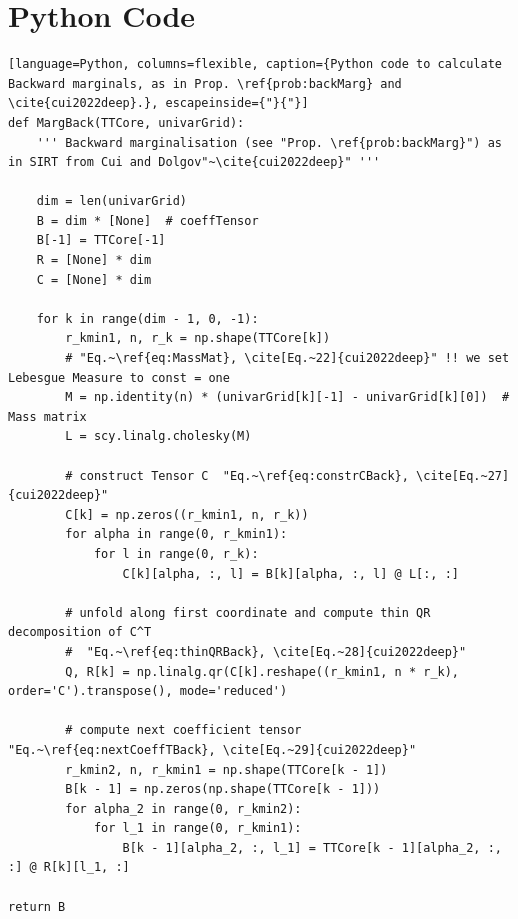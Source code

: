 \section{Python Code}

\begin{lstlisting}[language=Python, columns=flexible, caption={Python code to calculate Backward marginals, as in Prop. \ref{prob:backMarg} and \cite{cui2022deep}.}, escapeinside={"}{"}]
def MargBack(TTCore, univarGrid):
	''' Backward marginalisation (see "Prop. \ref{prob:backMarg}") as in SIRT from Cui and Dolgov"~\cite{cui2022deep}" '''
	
	dim = len(univarGrid)
	B = dim * [None]  # coeffTensor
	B[-1] = TTCore[-1]
	R = [None] * dim
	C = [None] * dim
	
	for k in range(dim - 1, 0, -1):
		r_kmin1, n, r_k = np.shape(TTCore[k])
		# "Eq.~\ref{eq:MassMat}, \cite[Eq.~22]{cui2022deep}" !! we set Lebesgue Measure to const = one
		M = np.identity(n) * (univarGrid[k][-1] - univarGrid[k][0])  # Mass matrix
		L = scy.linalg.cholesky(M)
		
		# construct Tensor C  "Eq.~\ref{eq:constrCBack}, \cite[Eq.~27]{cui2022deep}"
		C[k] = np.zeros((r_kmin1, n, r_k))
		for alpha in range(0, r_kmin1):
			for l in range(0, r_k):
				C[k][alpha, :, l] = B[k][alpha, :, l] @ L[:, :]
		
		# unfold along first coordinate and compute thin QR decomposition of C^T
		#  "Eq.~\ref{eq:thinQRBack}, \cite[Eq.~28]{cui2022deep}"
		Q, R[k] = np.linalg.qr(C[k].reshape((r_kmin1, n * r_k), order='C').transpose(), mode='reduced')
		
		# compute next coefficient tensor "Eq.~\ref{eq:nextCoeffTBack}, \cite[Eq.~29]{cui2022deep}"
		r_kmin2, n, r_kmin1 = np.shape(TTCore[k - 1])
		B[k - 1] = np.zeros(np.shape(TTCore[k - 1]))
		for alpha_2 in range(0, r_kmin2):
			for l_1 in range(0, r_kmin1):
				B[k - 1][alpha_2, :, l_1] = TTCore[k - 1][alpha_2, :, :] @ R[k][l_1, :]

return B

\end{lstlisting}
\clearpage
